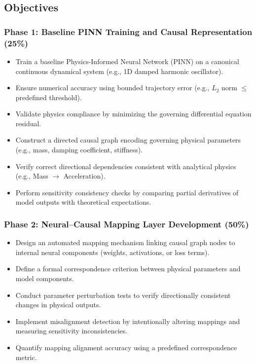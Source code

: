 \documentclass[12pt,singleside,a4paper]{article}
\begin{document}
\subsection{Objectives}

\subsubsection*{Phase 1: Baseline PINN Training and Causal Representation (25\%)}

\begin{itemize}
    \item Train a baseline Physics-Informed Neural Network (PINN) on a canonical continuous dynamical system (e.g., 1D damped harmonic oscillator).
    \item Ensure numerical accuracy using bounded trajectory error (e.g., $L_2$ norm $\leq$ predefined threshold).
    \item Validate physics compliance by minimizing the governing differential equation residual.
    \item Construct a directed causal graph encoding governing physical parameters (e.g., mass, damping coefficient, stiffness).
    \item Verify correct directional dependencies consistent with analytical physics (e.g., Mass $\rightarrow$ Acceleration).
    \item Perform sensitivity consistency checks by comparing partial derivatives of model outputs with theoretical expectations.
\end{itemize}

\subsubsection*{Phase 2: Neural--Causal Mapping Layer Development (50\%)}

\begin{itemize}
    \item Design an automated mapping mechanism linking causal graph nodes to internal neural components (weights, activations, or loss terms).
    \item Define a formal correspondence criterion between physical parameters and model components.
    \item Conduct parameter perturbation tests to verify directionally consistent changes in physical outputs.
    \item Implement misalignment detection by intentionally altering mappings and measuring sensitivity inconsistencies.
    \item Quantify mapping alignment accuracy using a predefined correspondence metric.
\end{itemize}
\end{document}
